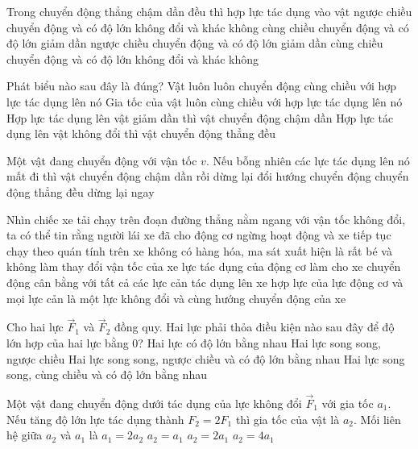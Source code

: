 \begin{ex}
	Trong chuyển động thẳng chậm dần đều thì hợp lực tác dụng vào vật
	\choice
	{\True ngược chiều chuyển động và có độ lớn không đổi và khác không}
	{cùng chiều chuyển động và có độ lớn giảm dần}
	{ngược chiều chuyển động và có độ lớn giảm dần}
	{cùng chiều chuyển động và có độ lớn không đổi và khác không}
	\loigiai{}
\end{ex}
\begin{ex}
	Phát biểu nào sau đây là đúng?
	\choice
	{Vật luôn luôn chuyển động cùng chiều với hợp lực tác dụng lên nó}
	{\True Gia tốc của vật luôn cùng chiều với hợp lực tác dụng lên nó}
	{Hợp lực tác dụng lên vật giảm dần thì vật chuyển động chậm dần}
	{Hợp lực tác dụng lên vật không đổi thì vật chuyển động thẳng đều}
	\loigiai{}
\end{ex}
\begin{ex}
	Một vật đang chuyển động với vận tốc $v$. Nếu bỗng nhiên các lực tác dụng lên nó mất đi thì vật
	\choice
	{chuyển động chậm dần rồi dừng lại}
	{đổi hướng chuyển động}
	{\True chuyển động thẳng đều}
	{dừng lại ngay}
	\loigiai{}
\end{ex}
\begin{ex}
	Nhìn chiếc xe tải chạy trên đoạn đường thẳng nằm ngang với vận tốc không đổi, ta có thể tin rằng
	\choice
	{người lái xe đã cho động cơ ngừng hoạt động và xe tiếp tục chạy theo quán tính}
	{trên xe không có hàng hóa, ma sát xuất hiện là rất bé và không làm thay đổi vận tốc của xe}
	{\True lực tác dụng của động cơ làm cho xe chuyển động cân bằng với tất cả các lực cản tác dụng lên xe}
	{hợp lực của lực động cơ và mọi lực cản là một lực không đổi và cùng hướng chuyển động của xe}
	\loigiai{}
\end{ex}
\begin{ex}
Cho hai lực $\vec{F}_1$ và $\vec{F}_2$ đồng quy. Hai lực phải thỏa điều kiện nào sau đây để độ lớn hợp của hai lực bằng 0?
	\choice
	{Hai lực có độ lớn bằng nhau}
	{Hai lực song song, ngược chiều}
	{\True Hai lực song song, ngược chiều và có độ lớn bằng nhau}
	{Hai lực song song, cùng chiều và có độ lớn bằng nhau}
	\loigiai{}
\end{ex}
\begin{ex}
	Một vật đang chuyển động dưới tác dụng của lực không đổi $\vec{F}_1$ với gia tốc $a_1$. Nếu tăng độ lớn lực tác dụng thành $F_2=2F_1$ thì gia tốc của vật là $a_2$. Mối liên hệ giữa $a_2$ và $a_1$ là
	\choice
	{$a_1=2a_2$}
	{$a_2=a_1$}
	{\True $a_2=2a_1$}
	{$a_2=4a_1$}
	\loigiai{}
\end{ex}

